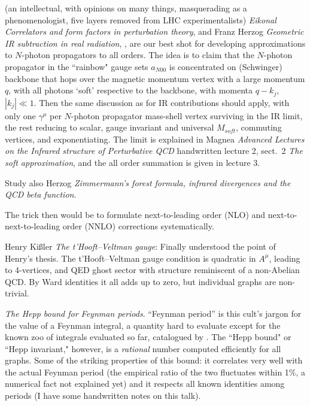 \begin{description}
 (an intellectual,
with opinions on many things, masquerading as a phenomenologist, five
layers removed from LHC experimentalists) {\em Eikonal Correlators and
form factors in perturbation theory},
and
{Franz Herzog} {\em Geometric IR subtraction in real radiation},
, are our best
shot for developing approximations to $N$-photon propagators to all orders.
The idea is to claim that the $N$-photon propagator in the ``rainbow"
gauge sets $a_{N00}$ is concentrated on (Schwinger) backbone that hops
over the magnetic momentum vertex with a large momentum $q$, with all photons
`soft' respective to the backbone, with momenta $q-k_j$, $|k_j|\ll 1$.
Then the same discussion as for IR contributions should apply, with
only one $\gamma^\mu$ per $N$-photon propagator mass-shell vertex
surviving in the IR limit, the rest reducing to scalar, gauge invariant
and universal $M_{soft}$, commuting
vertices, and exponentiating. The limit is explained in Magnea
{\em Advanced Lectures on the Infrared structure of Perturbative QCD}
handwritten
 {lecture 2},
sect.~2 {\em The soft approximation}, and the all order summation
is given in
 {lecture 3}.

Study also Herzog
{\em Zimmermann's forest formula, infrared divergences and the {QCD} beta function}.

The trick then would be to formulate  next-to-leading order (NLO) and
next-to-next-to-leading order (NNLO) corrections systematically.



{Henry Ki{\ss}ler} {\em The t'Hooft–Veltman gauge}:
Finally understood the point of Henry's thesis. The t'Hooft–Veltman gauge
condition is quadratic in $A^\mu$, leading to 4-vertices, and QED ghost
sector with structure reminiscent of a non-Abelian QCD.  By Ward
identities it all adds up to zero, but individual graphs are non-trivial.

 {\em The Hepp
bound for Feynman periods}. ``Feynman period'' is this cult's jargon for
the value of a Feynman integral, a quantity hard to evaluate except for
the known zoo of integrals evaluated so far, catalogued by
. The ``Hepp bound" or ``Hepp invariant," however,
is a \emph{rational} number computed efficiently for all graphs. Some of
the striking properties of this bound: it correlates very well with the
actual Feynman period (the empirical ratio of the two fluctuates within
1\%, a numerical fact not explained yet) and it respects all known
identities among periods  (I have some handwritten notes on this talk).


\end{description}
